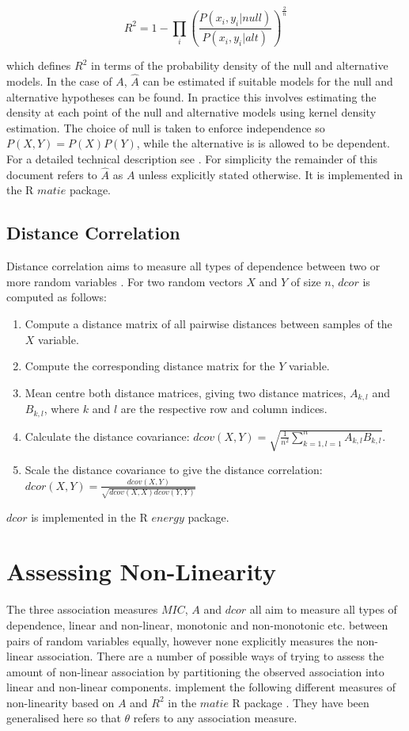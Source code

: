 \documentclass[a4paper, 12pt]{report}
\begin{document}
\[
R^2 = 1-\prod_i(\frac{P(x_i,y_i|null)}{P(x_i,y_i|alt)})^{\frac{2}{n}}
\]

which defines $R^2$ in terms of the probability density of the null and alternative models. In the case of $A$, $\hat{A}$ can be estimated if suitable models for the null and alternative hypotheses can be found. In practice this involves estimating the density at each point of the null and alternative models using kernel density estimation. The choice of null is taken to enforce independence so $P(X,Y)=P(X)P(Y)$, while the alternative is is allowed to be dependent. For a detailed technical description see \citet{Murrel:2013:Online}. For simplicity the remainder of this document refers to $\hat{A}$ as $A$ unless explicitly stated otherwise.  It is implemented in the R $matie$ \cite{matie} package.

\subsection*{Distance Correlation}
Distance correlation aims to measure all types of dependence between two or more random variables \cite{energy2013}. For two random vectors $X$ and $Y$ of size $n$, $dcor$ is computed as follows:

\begin{enumerate}
\item Compute a distance matrix of all pairwise distances between samples of the $X$ variable.
\item Compute the corresponding distance matrix for the $Y$ variable.
\item Mean centre both distance matrices, giving two distance matrices, $A_{k,l}$ and $B_{k,l}$, where $k$ and $l$ are the respective row and column indices.
\item Calculate the distance covariance: $dcov(X,Y) = \sqrt{\frac{1}{n^2} \sum^n_{k=1,l=1}A_{k,l}B_{k,l}}$.
\item Scale the distance covariance to give the distance correlation: \newline
$dcor(X,Y) = \frac{dcov(X,Y)}{\sqrt{dcov(X,X)dcov(Y,Y)}}$
\end{enumerate}

$dcor$ is implemented in the R $energy$ \cite{energy} package.  

\section{Assessing Non-Linearity}
The three association measures $MIC$, $A$ and $dcor$ all aim to measure all types of dependence, linear and non-linear, monotonic and non-monotonic etc. between pairs of random variables equally, however none explicitly measures the non-linear association. 
There are a number of possible ways of trying to assess the amount of non-linear association by partitioning the observed association into linear and non-linear components. \citet{Murrel:2013:Online} implement the following different measures of non-linearity based on $A$ and $R^2$ in the $matie$ R package \cite{matie}. They have been generalised here so that $\theta$ refers to any association measure.
\end{document}
